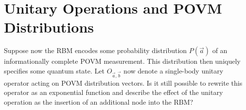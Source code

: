 \documentclass{article}
\begin{document}
\section{Unitary Operations and POVM Distributions}
Suppose now the RBM encodes some probability distribution $P(\vec{a})$ of an
informationally complete POVM measurement. This distribution then uniquely
specifies some quantum state. Let $O_{\vec{a},\vec{b}}$ now denote a single-body
unitary operator acting on POVM distribution vectors. Is it still possible to
rewrite this operator as an exponential function and describe the effect of the
unitary operation as the insertion of an additional node into the RBM? \par
\end{document}
